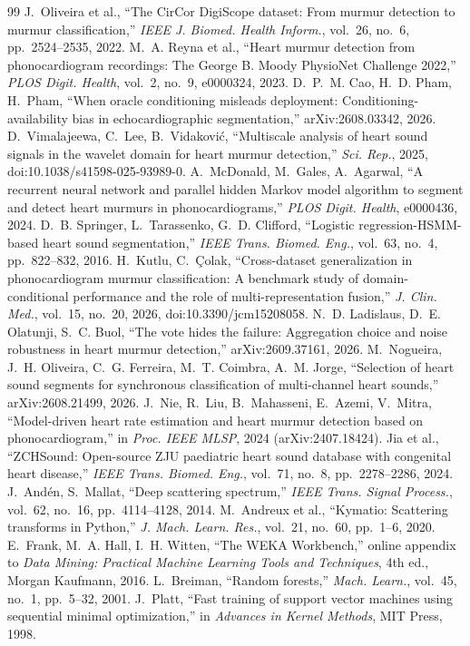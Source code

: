 \documentclass[conference]{IEEEtran}
\begin{document}
\begin{thebibliography}{99}\footnotesize
{} J.~Oliveira et al., ``The CirCor DigiScope dataset: From murmur detection to murmur classification,''
\emph{IEEE J. Biomed. Health Inform.}, vol.~26, no.~6, pp.~2524--2535, 2022.
 M.~A. Reyna et al., ``Heart murmur detection from phonocardiogram recordings: The George B. Moody PhysioNet
Challenge 2022,'' \emph{PLOS Digit. Health}, vol.~2, no.~9, e0000324, 2023.
 D.~P.~M. Cao, H.~D. Pham, H.~Pham, ``When oracle conditioning misleads deployment: Conditioning-availability
bias in echocardiographic segmentation,'' arXiv:2608.03342, 2026.
 D.~Vimalajeewa, C.~Lee, B.~Vidakovi\'c, ``Multiscale analysis of heart sound signals in the wavelet
domain for heart murmur detection,'' \emph{Sci. Rep.}, 2025, doi:10.1038/s41598-025-93989-0.
 A.~McDonald, M.~Gales, A.~Agarwal, ``A recurrent neural network and parallel hidden Markov model
algorithm to segment and detect heart murmurs in phonocardiograms,'' \emph{PLOS Digit. Health}, e0000436, 2024.
 D.~B. Springer, L.~Tarassenko, G.~D. Clifford, ``Logistic regression-HSMM-based heart sound
segmentation,'' \emph{IEEE Trans. Biomed. Eng.}, vol.~63, no.~4, pp.~822--832, 2016.
 H.~Kutlu, C.~\c{C}olak, ``Cross-dataset generalization in phonocardiogram murmur classification: A benchmark
study of domain-conditional performance and the role of multi-representation fusion,'' \emph{J. Clin. Med.}, vol.~15, no.~20,
2026, doi:10.3390/jcm15208058.
 N.~D. Ladislaus, D.~E. Olatunji, S.~C. Buol, ``The vote hides the failure: Aggregation choice and noise
robustness in heart murmur detection,'' arXiv:2609.37161, 2026.
 M.~Nogueira, J.~H. Oliveira, C.~G. Ferreira, M.~T. Coimbra, A.~M. Jorge, ``Selection of heart sound
segments for synchronous classification of multi-channel heart sounds,'' arXiv:2608.21499, 2026.
 J.~Nie, R.~Liu, B.~Mahasseni, E.~Azemi, V.~Mitra, ``Model-driven heart rate estimation and heart murmur
detection based on phonocardiogram,'' in \emph{Proc. IEEE MLSP}, 2024 (arXiv:2407.18424).
 Jia et al., ``ZCHSound: Open-source ZJU paediatric heart sound database with congenital heart disease,''
\emph{IEEE Trans. Biomed. Eng.}, vol.~71, no.~8, pp.~2278--2286, 2024.
 J.~And\'en, S.~Mallat, ``Deep scattering spectrum,'' \emph{IEEE Trans. Signal Process.}, vol.~62, no.~16,
pp.~4114--4128, 2014.
 M.~Andreux et al., ``Kymatio: Scattering transforms in Python,'' \emph{J. Mach. Learn. Res.}, vol.~21,
no.~60, pp.~1--6, 2020.
 E.~Frank, M.~A. Hall, I.~H. Witten, ``The WEKA Workbench,'' online appendix to \emph{Data Mining: Practical
Machine Learning Tools and Techniques}, 4th ed., Morgan Kaufmann, 2016.
 L.~Breiman, ``Random forests,'' \emph{Mach. Learn.}, vol.~45, no.~1, pp.~5--32, 2001.
 J.~Platt, ``Fast training of support vector machines using sequential minimal optimization,'' in
\emph{Advances in Kernel Methods}, MIT Press, 1998.
\end{thebibliography}
\end{document}
